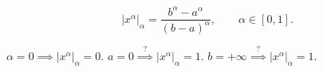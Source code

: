 \documentclass[12pt]{article}					%
\begin{document}
\begin{veta}
	$$ |x^\alpha|_\alpha = \frac{b^\alpha - a^\alpha}{(b - a)^\alpha}, \qquad \alpha \in [0, 1]. $$

	\begin{dukazin}
		$\alpha = 0 \implies |x^\alpha|_\alpha = 0$. $a = 0 \stackrel?\implies |x^\alpha|_\alpha = 1$. $b = +∞ \stackrel?\implies |x^\alpha|_\alpha = 1$.
	\end{dukazin}
\end{veta}
\end{document}
